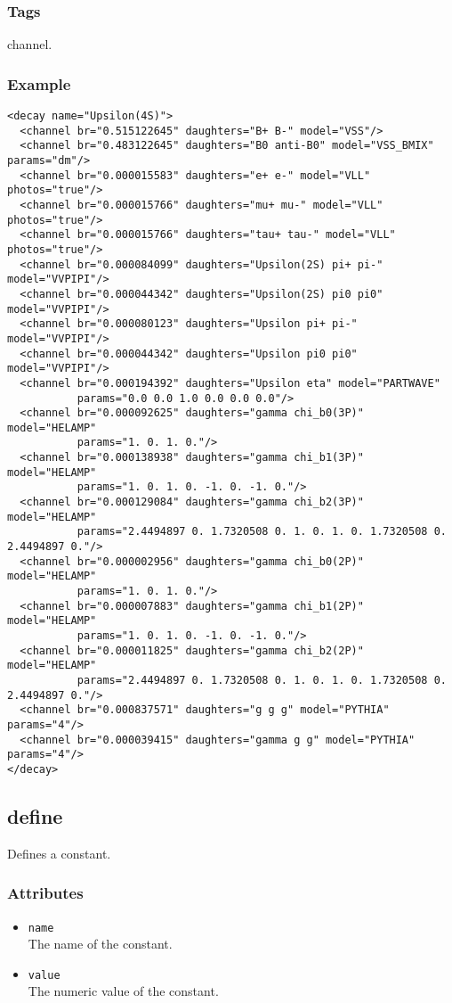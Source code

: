 \subsubsection*{Tags}
channel.
\subsubsection*{Example}
{\footnotesize
\begin{verbatim}
<decay name="Upsilon(4S)">
  <channel br="0.515122645" daughters="B+ B-" model="VSS"/>
  <channel br="0.483122645" daughters="B0 anti-B0" model="VSS_BMIX" params="dm"/>
  <channel br="0.000015583" daughters="e+ e-" model="VLL" photos="true"/>
  <channel br="0.000015766" daughters="mu+ mu-" model="VLL" photos="true"/>
  <channel br="0.000015766" daughters="tau+ tau-" model="VLL" photos="true"/>
  <channel br="0.000084099" daughters="Upsilon(2S) pi+ pi-" model="VVPIPI"/>
  <channel br="0.000044342" daughters="Upsilon(2S) pi0 pi0" model="VVPIPI"/>
  <channel br="0.000080123" daughters="Upsilon pi+ pi-" model="VVPIPI"/>
  <channel br="0.000044342" daughters="Upsilon pi0 pi0" model="VVPIPI"/>
  <channel br="0.000194392" daughters="Upsilon eta" model="PARTWAVE"
           params="0.0 0.0 1.0 0.0 0.0 0.0"/>
  <channel br="0.000092625" daughters="gamma chi_b0(3P)" model="HELAMP"
           params="1. 0. 1. 0."/>
  <channel br="0.000138938" daughters="gamma chi_b1(3P)" model="HELAMP"
           params="1. 0. 1. 0. -1. 0. -1. 0."/>
  <channel br="0.000129084" daughters="gamma chi_b2(3P)" model="HELAMP"
           params="2.4494897 0. 1.7320508 0. 1. 0. 1. 0. 1.7320508 0. 2.4494897 0."/>
  <channel br="0.000002956" daughters="gamma chi_b0(2P)" model="HELAMP"
           params="1. 0. 1. 0."/>
  <channel br="0.000007883" daughters="gamma chi_b1(2P)" model="HELAMP"
           params="1. 0. 1. 0. -1. 0. -1. 0."/>
  <channel br="0.000011825" daughters="gamma chi_b2(2P)" model="HELAMP"
           params="2.4494897 0. 1.7320508 0. 1. 0. 1. 0. 1.7320508 0. 2.4494897 0."/>
  <channel br="0.000837571" daughters="g g g" model="PYTHIA" params="4"/>
  <channel br="0.000039415" daughters="gamma g g" model="PYTHIA" params="4"/>
</decay>
\end{verbatim}
}

\subsection{define}
Defines a constant.
\subsubsection*{Attributes}
\begin{itemize}
\item{\tt name}\\
      The name of the constant.
\item{\tt value}\\
      The numeric value of the constant.
\end{itemize}
